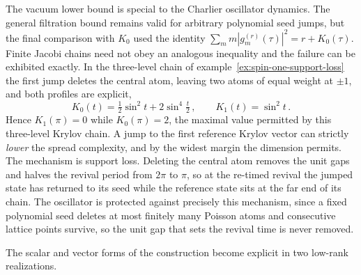 \documentclass[a4paper,11pt]{article}
\theoremstyle{definition}
\theoremstyle{remark}
\begin{document}
The vacuum lower bound is special to the Charlier oscillator dynamics. The general filtration bound remains valid for arbitrary polynomial seed jumps, but the final comparison with \(K_0\) used the identity \(\sum_m m|g_m^{(r)}(\tau)|^2=r+K_0(\tau)\). Finite Jacobi chains need not obey an analogous inequality and the failure can be exhibited
exactly. In the three-level chain of example~\ref{ex:spin-one-support-loss} the first jump deletes
the central atom, leaving two atoms of equal weight at $\pm1$, and both profiles are explicit,
\begin{equation}
   K_0(t)=\tfrac12\sin^2t+2\sin^4\tfrac t2\,,
   \qquad
   K_1(t)=\sin^2t\, .
   \label{eq:three-level-decrease}
\end{equation}
Hence $K_1(\pi)=0$ while $K_0(\pi)=2$, the maximal value permitted by this
three-level Krylov chain. A jump
to the first reference Krylov vector can strictly \emph{lower} the spread complexity, and by the
widest margin the dimension permits. The mechanism is support loss. Deleting the central atom
removes the unit gaps and halves the revival period from $2\pi$ to $\pi$, so at the re-timed
revival the jumped state has returned to its seed while the reference state sits at the far end of
its chain. The oscillator is protected against precisely this mechanism, since a fixed polynomial
seed deletes at most finitely many Poisson atoms and consecutive lattice points survive, so the
unit gap that sets the revival time is never removed.

The scalar and vector forms of the construction become explicit in two low-rank realizations.
\end{document}
